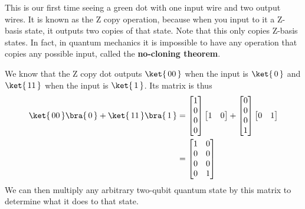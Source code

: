 \documentclass{article}
\theoremstyle{definition}
\newcommand{\kz}[1]{\ket{\,#1\,}}
\newcommand{\bz}[1]{\bra{\,#1\,}}
\begin{document}
This is our first time seeing a green dot with one input wire and two output wires.
It is known as the Z copy operation, because when you input to it a Z-basis state, it outputs two copies of that state.
Note that this only copies Z-basis states.  In fact, in quantum mechanics it is impossible to have any operation that copies any possible input, called the \textbf{no-cloning theorem}.

We know that the Z copy dot outputs $\kz{00}$ when the input is $\kz0$ and $\kz{11}$ when the input is $\kz1$.  Its matrix is thus
\begin{align}
	\kz{00} \bz0 + \kz{11} \bz1 &= \begin{bmatrix}
		1\\ 0\\ 0\\ 0
	\end{bmatrix} \begin{bmatrix}
		1 & 0
	\end{bmatrix} + \begin{bmatrix}
		0\\ 0\\ 0\\ 1
	\end{bmatrix} \begin{bmatrix}
		0 & 1
	\end{bmatrix}\\
	&= \begin{bmatrix}
		1 & 0\\
		0 & 0\\
		0 & 0\\
		0 & 1
	\end{bmatrix}
\end{align}
We can then multiply any arbitrary two-qubit quantum state by this matrix to determine what it does to that state.
\end{document}
